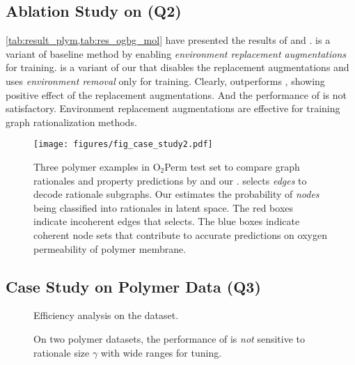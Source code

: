 \documentclass[sigconf]{acmart}
\begin{document}
\subsection{Ablation Study on \method (Q2)}\label{sec:q2_abalation}
\cref{tab:result_plym,tab:res_ogbg_mol} have presented the results of \dirplusaug and \methodnoaug. \dirplusaug is a variant of baseline method \dir by enabling \emph{environment replacement augmentations} for training. \methodnoaug is a variant of our \method that disables the replacement augmentations and uses \emph{environment removal} only for training.
Clearly, \dirplusaug outperforms \dir, showing positive effect of the replacement augmentations.
And the performance of \methodnoaug is not satisfactory. Environment replacement augmentations are effective for training graph rationalization methods.

\begin{figure}[t]
    \centering
    \texttt{[image: figures/fig\_case\_study2.pdf]}
    \vspace{-0.1in}
    \caption{Three polymer examples in O$_2$Perm test set to compare graph rationales and property predictions by \dir \cite{wu2022discovering} and our \method. \dir selects \emph{edges} to decode rationale subgraphs. Our \method estimates the probability of \emph{nodes} being classified into rationales in latent space. The red boxes indicate incoherent edges that \dir selects. The blue boxes indicate coherent node sets that contribute to accurate predictions on oxygen permeability of polymer membrane.}
    \label{fig:case_study}
    \vspace{-0.15in}
\end{figure}
\subsection{Case Study on Polymer Data (Q3)}\label{sec:q3_casestudy}
\begin{figure}[t]
    \centering
    \hfill
    \vspace{-0.05in}
    \caption{Efficiency analysis on the \hiv dataset.}
    \label{fig:efficiency}
\end{figure}
\begin{figure}[t]
    \centering
    \hfill
    \vspace{-0.1in}
    \caption{On two polymer datasets, the performance of \method is \emph{not} sensitive to rationale size $\gamma$ with wide ranges for tuning.}
\label{fig:sensitivity_gamma}
    \vspace{-0.05in}
\end{figure}
\end{document}
